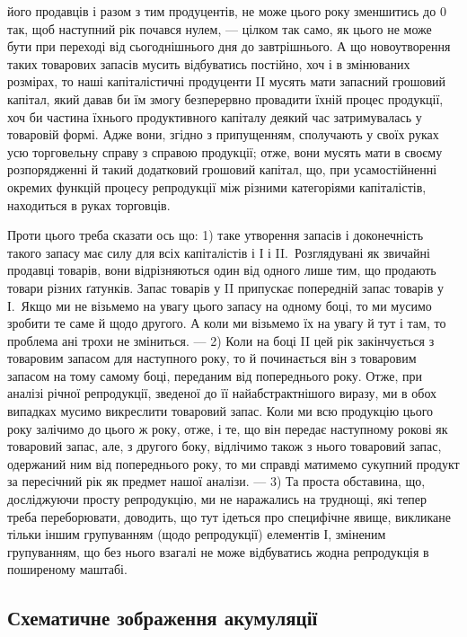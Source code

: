 \parcont{}  %
його продавців і разом з тим продуцентів, не може цього року зменшитись
до 0 так, щоб наступний рік почався нулем, — цілком так само, як
цього не може бути при переході від сьогоднішнього дня до завтрішнього.
А що новоутворення таких товарових запасів мусить відбуватись постійно,
хоч і в змінюваних розмірах, то наші капіталістичні продуценти II мусять
мати запасний грошовий капітал, який давав би їм змогу безперервно
провадити їхній процес продукції, хоч би частина їхнього продуктивного
капіталу деякий час затримувалась у товаровій формі. Адже вони, згідно
з припущенням, сполучають у своїх руках усю торговельну справу
з справою продукції; отже, вони мусять мати в своєму розпорядженні
й такий додатковий грошовий капітал, що, при усамостійненні окремих
функцій процесу репродукції між різними категоріями капіталістів, находиться
в руках торговців.

Проти цього треба сказати ось що: 1) таке утворення запасів і доконечність
такого запасу має силу для всіх капіталістів і І і II.~Розглядувані
як звичайні продавці товарів, вони відрізняються один від одного
лише тим, що продають товари різних ґатунків. Запас товарів у II припускає
попередній запас товарів у І.~Якщо ми не візьмемо на увагу
цього запасу на одному боці, то ми мусимо зробити те саме й щодо
другого. А коли ми візьмемо їх на увагу й тут і там, то проблема ані
трохи не зміниться. — 2) Коли на боці II цей рік закінчується з товаровим
запасом для наступного року, то й починається він з товаровим запасом
на тому самому боці, переданим від попереднього року.
Отже, при аналізі річної репродукції, зведеної до її найабстрактнішого виразу,
ми в обох випадках мусимо викреслити товаровий запас. Коли ми всю
продукцію цього року залічимо до цього ж року, отже, і те, що він передає
наступному рокові як товаровий запас, але, з другого боку, відлічимо
також з нього товаровий запас, одержаний ним від попереднього року,
то ми справді матимемо сукупний продукт за пересічний рік як предмет
нашої аналізи. — 3) Та проста обставина, що, досліджуючи просту
репродукцію, ми не наражались на труднощі, які тепер треба переборювати,
доводить, що тут ідеться про специфічне явище, викликане тільки
іншим групуванням (щодо репродукції) елементів І, зміненим групуванням,
що без нього взагалі не може відбуватись жодна репродукція в поширеному
маштабі.

\subsection{Схематичне зображення акумуляції}

